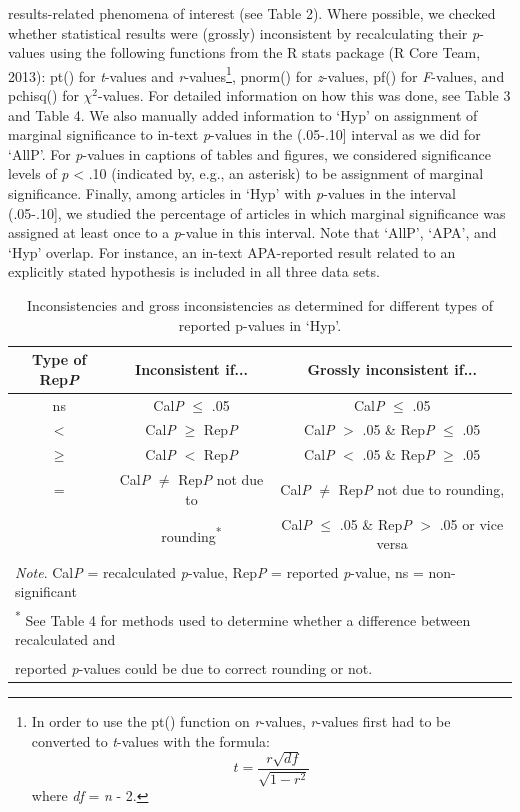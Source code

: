 \documentclass[
  12pt,
]{article}
\begin{document}
results-related phenomena of interest (see Table 2). Where possible, we
checked whether statistical results were (grossly) inconsistent by
recalculating their \emph{p}-values using the following functions from
the R stats package (R Core Team, 2013): pt() for \emph{t}-values and
\emph{r}-values\footnote{In order to use the pt() function on
  \emph{r}-values, \emph{r}-values first had to be converted to
  \emph{t}-values with the formula:
  \[ t = \frac{r\sqrt{df}}{\sqrt{1-r^2}} \] where \emph{df} = \emph{n} -
  2.}, pnorm() for \emph{z}-values, pf() for \emph{F}-values, and
pchisq() for \(\chi^2\)-values. For detailed information on how this was
done, see Table 3 and Table 4. We also manually added information to
`Hyp' on assignment of marginal significance to in-text \emph{p}-values
in the (.05-.10{]} interval as we did for `AllP'. For \emph{p}-values in
captions of tables and figures, we considered significance levels of
\emph{p} \textless{} .10 (indicated by, e.g., an asterisk) to be
assignment of marginal significance. Finally, among articles in `Hyp'
with \emph{p}-values in the interval (.05-.10{]}, we studied the
percentage of articles in which marginal significance was assigned at
least once to a \emph{p}-value in this interval. Note that `AllP',
`APA', and `Hyp' overlap. For instance, an in-text APA-reported result
related to an explicitly stated hypothesis is included in all three data
sets.\\

\begin{table}[H]

\caption{\label{tab:Table 3 definition consistencies and gross inconsistencies Hyp}Inconsistencies and gross inconsistencies as determined for different types of reported p-values in  ‘Hyp'.}
\centering
\fontsize{12}{14}\selectfont
\begin{tabular}[t]{ccc}
\toprule
Type of Rep\emph{P} & Inconsistent if... & Grossly inconsistent if...\\
\midrule
ns & Cal\emph{P} $\leq$ .05 & Cal\emph{P} $\leq$ .05\\
$<$ & Cal\emph{P} $\geq$ Rep\emph{P} & Cal\emph{P} $>$ .05 \& Rep\emph{P} $\leq$ .05\\
$\geq$ & Cal\emph{P} $<$ Rep\emph{P} & Cal\emph{P} $<$ .05 \& Rep\emph{P} $\geq$ .05\\
= & Cal\emph{P} $\neq$ Rep\emph{P} not due to & Cal\emph{P} $\neq$ Rep\emph{P} not due to rounding,\\
 & rounding\textsuperscript{*} & Cal\emph{P} $\leq$ .05 \& Rep\emph{P} $>$ .05 or vice versa\\
\bottomrule
\multicolumn{3}{l}{\textsuperscript{} \emph{Note}. Cal\emph{P} = recalculated \emph{p}-value, Rep\emph{P} = reported \emph{p}-value, ns = non-significant}\\
\multicolumn{3}{l}{\textsuperscript{*} See Table 4 for methods used to determine whether a difference between recalculated and}\\
\multicolumn{3}{l}{\textsuperscript{} reported \emph{p}-values could be due to correct rounding or not.}\\
\end{tabular}
\end{table}
\pagebreak
\end{document}
